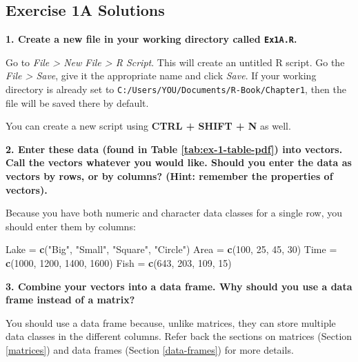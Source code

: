 \documentclass[]{book}
\newenvironment{Shaded}{\begin{snugshade}}{\end{snugshade}}
\newcommand{\KeywordTok}[1]{\textcolor[rgb]{0.13,0.29,0.53}{\textbf{#1}}}
\newcommand{\DecValTok}[1]{\textcolor[rgb]{0.00,0.00,0.81}{#1}}
\newcommand{\StringTok}[1]{\textcolor[rgb]{0.31,0.60,0.02}{#1}}
\newcommand{\NormalTok}[1]{#1}
\theoremstyle{definition}
\theoremstyle{definition}
\theoremstyle{definition}
\theoremstyle{remark}
\begin{document}
\hypertarget{ex1a-answers}{\subsection*{Exercise 1A
Solutions}\label{ex1a-answers}}

\textbf{1. Create a new file in your working directory called
\texttt{Ex1A.R}.}

Go to \emph{File \textgreater{} New File \textgreater{} R Script}. This
will create an untitled R script. Go the \emph{File \textgreater{}
Save}, give it the appropriate name and click \emph{Save}. If your
working directory is already set to
\texttt{C:/Users/YOU/Documents/R-Book/Chapter1}, then the file will be
saved there by default.

You can create a new script using \textbf{CTRL + SHIFT + N} as well.

\textbf{2. Enter these data (found in Table \ref{tab:ex-1-table-pdf})
into vectors. Call the vectors whatever you would like. Should you enter
the data as vectors by rows, or by columns? (Hint: remember the
properties of vectors).}

Because you have both numeric and character data classes for a single
row, you should enter them by columns:

\begin{Shaded}
\begin{Highlighting}[]
\NormalTok{Lake =}\StringTok{ }\KeywordTok{c}\NormalTok{(}\StringTok{"Big"}\NormalTok{, }\StringTok{"Small"}\NormalTok{, }\StringTok{"Square"}\NormalTok{, }\StringTok{"Circle"}\NormalTok{)}
\NormalTok{Area =}\StringTok{ }\KeywordTok{c}\NormalTok{(}\DecValTok{100}\NormalTok{, }\DecValTok{25}\NormalTok{, }\DecValTok{45}\NormalTok{, }\DecValTok{30}\NormalTok{)}
\NormalTok{Time =}\StringTok{ }\KeywordTok{c}\NormalTok{(}\DecValTok{1000}\NormalTok{, }\DecValTok{1200}\NormalTok{, }\DecValTok{1400}\NormalTok{, }\DecValTok{1600}\NormalTok{)}
\NormalTok{Fish =}\StringTok{ }\KeywordTok{c}\NormalTok{(}\DecValTok{643}\NormalTok{, }\DecValTok{203}\NormalTok{, }\DecValTok{109}\NormalTok{, }\DecValTok{15}\NormalTok{)}
\end{Highlighting}
\end{Shaded}

\textbf{3. Combine your vectors into a data frame. Why should you use a
data frame instead of a matrix?}

You should use a data frame because, unlike matrices, they can store
multiple data classes in the different columns. Refer back the sections
on matrices (Section \ref{matrices}) and data frames (Section
\ref{data-frames}) for more details.
\end{document}
